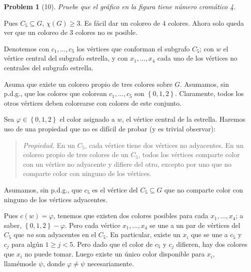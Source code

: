 \documentclass[a4paper]{article}
\newtheorem{problem}{Problem}
\newtheorem{problem}{Problem}
\begin{document}
\pagebreak 

\begin{problem}[10]
    Pruebe que el gráfico en la figura tiene número cromático 4.
\end{problem}

Pues $C_5 \subseteq G$, $\chi(G) \geq 3$. Es fácil dar un coloreo de $4$ colores. 
Ahora solo queda ver que un coloreo de 3 colores no es posible.

Denotemos con $c_1, \ldots, c_5$ los vértices que conforman el subgrafo 
$C_5$; con $w$ el vértice central del subgrafo estrella, y con 
$x_1, \ldots, x_4$ cada uno de los vértices no centrales 
del subgrafo estrella.

Asuma que existe un coloreo propio de tres colores sobre $G$. Asumamos, sin
p.d.g., que los colores que colorean $c_1, \ldots, c_5$ son $\left\{ 0, 1, 2
\right\} $. Claramente, todos los otros vértices deben colorearse 
con colores de este conjunto. 

Sea $\varphi \in \left\{ 0, 1, 2 \right\} $ el color asignado a $w$, el vértice
central de la estrella. Haremos uso de una propiedad que 
no es difícil de probar (y es trivial observar):


\small
\begin{quote}

\textit{Propiedad.} En un $C_5$, cada vértice tiene dos vértices no adyacentes.
En un coloreo propio de tres colores de un $C_5$, todos los vértices comparte
color con un vértice no adyacente y difiere del otro, excepto por uno que no
comparte color con ninguno de los vértices.

\end{quote}
\normalsize

Asumamos, sin p.d.g., que $c_5$ es el vértice del $C_5 \subseteq G$ que no
comparte color con ninguno de los vértices adyacentes. 

Pues $c(w) = \varphi$, tenemos que existen dos colores posibles para cada $x_1,
\ldots, x_4$; a saber, $\left\{ 0, 1, 2 \right\} - \varphi$. Pero cada vértice
$x_1, \ldots, x_4$ se une a un par de vértices del $C_5$ que \textit{no} son
adyacentes en el $C_5$. En particular, existe un $x_i$ que se une a $c_5$ y
$c_j$ para algún $1 \geq j < 5$. Pero dado que el color de $c_5$ y $c_j$
difieren, hay dos colores que $x_i$ no puede tomar. Luego existe un único color
disponible para $x_i$, llamémosle $\psi$, donde $\varphi \neq \psi$
necesariamente. 




\pagebreak 
\end{document}
